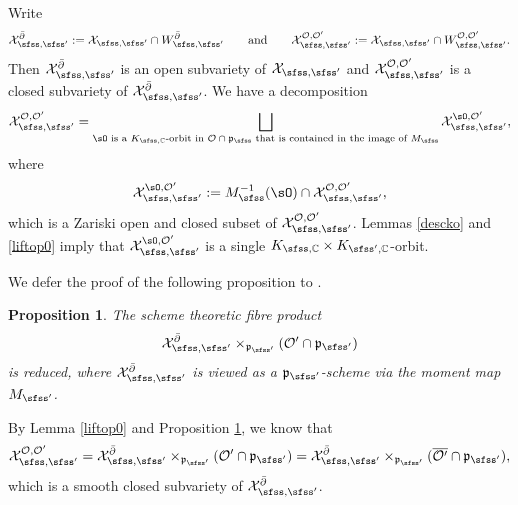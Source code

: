 \documentclass[12pt,a4paper]{amsart}
\newcommand{\CO}{{\mathcal {O}}}
\newcommand{\CX}{{\mathcal {X}}}
\newcommand{\p}{\mathfrak p}
\newcommand{\be}{\begin {equation}}
\newcommand{\ee}{\end {equation}}
\numberwithin{equation}{section}
\newtheorem{prop}[thm]{Proposition}
\theoremstyle{remark}
\begin{document}
Write
\[
    \CX_{\sfss, \sfss'}^{\bar \partial}:=\CX_{\sfss, \sfss'} \cap W_{\sfss, \sfss'}^{\bar \partial}\qquad\textrm{and}\qquad \CX_{\sfss, \sfss'}^{\CO, \CO'}:=\CX_{\sfss, \sfss'} \cap W_{\sfss, \sfss'}^{\CO, \CO'}.
   \]
Then  $ \CX_{\sfss, \sfss'}^{\bar \partial}$ is an open subvariety of $ \CX_{\sfss, \sfss'}$ and  $\CX_{\sfss, \sfss'}^{\CO, \CO'}$ is a  closed subvariety of  $\CX_{\sfss, \sfss'}^{\bar \partial}$. We have a decomposition
 \[
   \CX_{\sfss, \sfss'}^{\CO, \CO'}=\bigsqcup_{\sO\textrm{ is a   $K_{\sfss, \C}$-orbit in $ \CO\cap \p_\sfss$ that is contained in the image of $M_\sfss$}}  \CX_{\sfss, \sfss'}^{\sO, \CO'},
 \]
 where
 \[
   \CX_{\sfss, \sfss'}^{\sO, \CO'}:=M_\sfss^{-1}(\sO)\cap \CX_{\sfss, \sfss'}^{\CO, \CO'},
 \]
 which is a Zariski open and closed subset of $\CX_{\sfss, \sfss'}^{\CO, \CO'}$. Lemmas \ref{descko} and \ref{liftop0} imply that $ \CX_{\sfss, \sfss'}^{\sO, \CO'}$ is a single $K_{\sfss, \C}\times K_{\sfss',\C}$-orbit.

\medskip

We defer the proof of the following proposition to .
\begin{prop}\label{propreduced}
 The scheme theoretic  fibre product
\[
\CX_{\sfss, \sfss'}^{\bar \partial}\times_{\p_{\sfss'}} ({\CO'}\cap \p_{\sfss'})
\]
is reduced, where $\CX_{\sfss, \sfss'}^{\bar \partial}$ is viewed as a $\p_{\sfss'}$-scheme via the moment map $M_{\sfss'}$.
\end{prop}

By Lemma \ref{liftop0} and Proposition \ref{propreduced}, we know that
\be\label{cxee}
 \CX_{\sfss, \sfss'}^{\CO, \CO'}=\CX_{\sfss, \sfss'}^{\bar \partial}\times_{\p_{\sfss'}} ({\CO'}\cap \p_{\sfss'})=\CX_{\sfss, \sfss'}^{\bar \partial}\times_{\p_{\sfss'}} ({\overline{\CO'}}\cap \p_{\sfss'}),
 \ee
 which  is a smooth closed subvariety of $\CX_{\sfss, \sfss'}^{\bar \partial}$.
\end{document}
